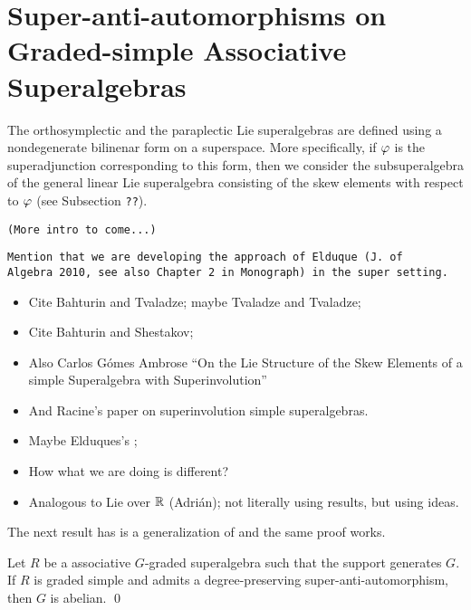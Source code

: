 \chapter{Super-anti-automorphisms on Graded-simple Associative Superalgebras}\label{chap:super-inv}


The orthosymplectic and the paraplectic Lie superalgebras are defined using a nondegenerate bilinenar form on a superspace.
More specifically, if $\varphi$ is the superadjunction corresponding to this form, then we consider the subsuperalgebra of the general linear Lie superalgebra consisting of the skew elements with respect to $\varphi$ (see Subsection {\tt ??}).

\vspace{5mm}
{\tt (More intro to come...)}

{\tt Mention that we are developing the approach of Elduque (J. of \\Al\-ge\-bra 2010, see also Chapter 2 in Monograph) in the super setting.}

\begin{itemize}
	\item Cite Bahturin and Tvaladze; maybe Tvaladze and Tvaladze;
	\item Cite Bahturin and Shestakov;
	\item Also Carlos G\'omes Ambrose ``On the Lie Structure of the Skew Elements of a simple Superalgebra with Superinvolution''
	\item And Racine's paper on superinvolution simple superalgebras.
	\item Maybe Elduques's \cite{elduqueSuperinv};
	\item How what we are doing is different?
	\item Analogous to Lie over $\mathbb{R}$ (Adri\'an); not literally using results, but using ideas.
\end{itemize}

The next result has is a generalization of \cite[Proposition 2.49]{livromicha} and the same proof works.

\begin{prop}\label{prop:grd-simple-vphi-abelian}
    Let $R$ be a associative $G$-graded superalgebra such that the support generates $G$. 
    If $R$ is graded simple and admits a degree-preserving super-anti-automorphism, then $G$ is abelian. \qed
\end{prop}



